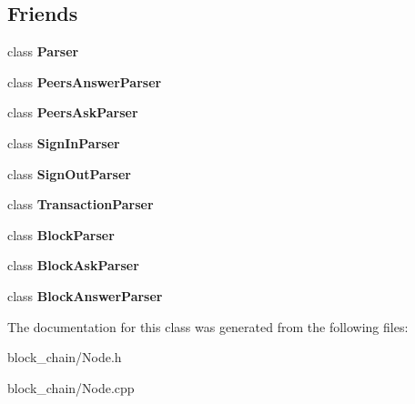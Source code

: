 \subsection*{Friends}
\begin{DoxyCompactItemize}
\item 
\mbox{\label{classNode_ab80291af9c262f63b83fa9c16f12014d}} 
class {\bfseries Parser}
\item 
\mbox{\label{classNode_a9e3cdec4aeecdf3e8af4ce55247056b5}} 
class {\bfseries Peers\+Answer\+Parser}
\item 
\mbox{\label{classNode_a4e698afe7d3c1a9bbb147968cd3d0967}} 
class {\bfseries Peers\+Ask\+Parser}
\item 
\mbox{\label{classNode_aedbc6d52e9be9e8e9b9e185d53352518}} 
class {\bfseries Sign\+In\+Parser}
\item 
\mbox{\label{classNode_ad8b6311fd20b52f64b7ab8838b5c74d1}} 
class {\bfseries Sign\+Out\+Parser}
\item 
\mbox{\label{classNode_a760b1478b5214c122458f0f19d45c127}} 
class {\bfseries Transaction\+Parser}
\item 
\mbox{\label{classNode_a8428b3aeea6607d1ba12e603ff9d015c}} 
class {\bfseries Block\+Parser}
\item 
\mbox{\label{classNode_a8400d228b4c8e958886ed78dbbce07cf}} 
class {\bfseries Block\+Ask\+Parser}
\item 
\mbox{\label{classNode_aec03b63df2dcea2b43f28ba4ede77b27}} 
class {\bfseries Block\+Answer\+Parser}
\end{DoxyCompactItemize}


The documentation for this class was generated from the following files\+:\begin{DoxyCompactItemize}
\item 
block\+\_\+chain/Node.\+h\item 
block\+\_\+chain/Node.\+cpp\end{DoxyCompactItemize}
